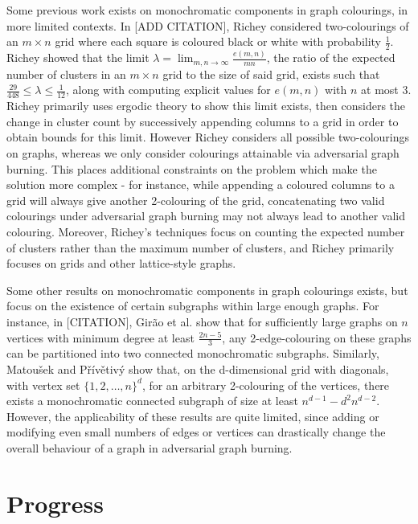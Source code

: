 \documentclass{mprop}
\begin{document}
Some previous work exists on monochromatic components in graph colourings, in more limited contexts. In [ADD CITATION], Richey considered two-colourings of an $m \times n$ grid where each square is coloured black or white with probability $\frac{1}{2}$. Richey showed that the limit $\lambda = \lim_{m, n \rightarrow \infty} \frac{e(m, n)}{mn}$, the ratio of the expected number of clusters in an $m \times n$ grid to the size of said grid, exists such that $\frac{29}{448} \leq \lambda \leq \frac{1}{12}$, along with computing explicit values for $e(m,n)$ with $n$ at most 3. Richey primarily uses ergodic theory to show this limit exists, then considers the change in cluster count by successively appending columns to a grid in order to obtain bounds for this limit. However Richey considers all possible two-colourings on graphs, whereas we only consider colourings attainable via adversarial graph burning. This places additional constraints on the problem which make the solution more complex - for instance, while appending a coloured columns to a grid will always give another 2-colouring of the grid, concatenating two valid colourings under adversarial graph burning may not always lead to another valid colouring. Moreover, Richey's techniques focus on counting the expected number of clusters rather than the maximum number of clusters, and Richey primarily focuses on grids and other lattice-style graphs.

Some other results on monochromatic components in graph colourings exists, but focus on the existence of certain subgraphs within large enough graphs. For instance, in [CITATION], Gir\~ao et al. show that for sufficiently large graphs on $n$ vertices with minimum degree at least $\frac{2n-5}{3}$, any 2-edge-colouring on these graphs can be partitioned into two connected monochromatic subgraphs. Similarly, Matou\v sek and P\v r\'iv\v etiv\'y show that, on the d-dimensional grid with diagonals, with vertex set $\{1,2,\dots,n\}^d$, for an arbitrary 2-colouring of the vertices, there exists a monochromatic connected subgraph of size at least $n^{d-1}-d^2n^{d-2}$. However, the applicability of these results are quite limited, since adding or modifying even small numbers of edges or vertices can drastically change the overall behaviour of a graph in adversarial graph burning.


\section{Progress}
\end{document}

